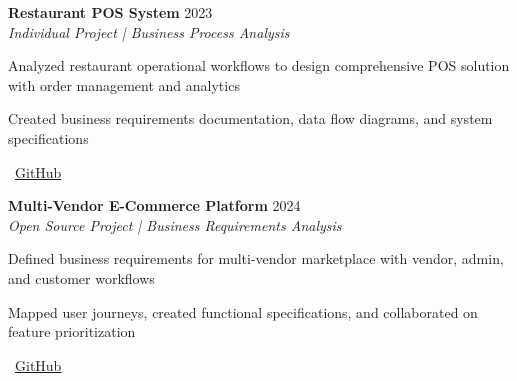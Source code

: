 \documentclass[letterpaper,10pt]{article}
\newenvironment{resume_list}{
  \vspace{-2pt}
  \begin{itemize}[itemsep=1pt, leftmargin=14pt]
}{
  \end{itemize}\vspace{-3pt}
}
\begin{document}

\textbf{Restaurant POS System} \hfill 2023\\
\textit{Individual Project | Business Process Analysis}\\
\begin{resume_list}
  \item Analyzed restaurant operational workflows to design comprehensive POS solution with order management and analytics
  \item Created business requirements documentation, data flow diagrams, and system specifications
  \item \faGithub~\href{https://github.com/vindyakodithuwakku02/pos-system.git}{GitHub}
\end{resume_list}

\vspace{5mm} %

\textbf{Multi-Vendor E-Commerce Platform} \hfill 2024\\
\textit{Open Source Project | Business Requirements Analysis}\\
\begin{resume_list}
  \item Defined business requirements for multi-vendor marketplace with vendor, admin, and customer workflows
  \item Mapped user journeys, created functional specifications, and collaborated on feature prioritization
  \item \faGithub~\href{https://github.com/vindyakodithuwakku02/gocart.git}{GitHub}
\end{resume_list}


\end{document}
\end{resume_list}
\end{document}
